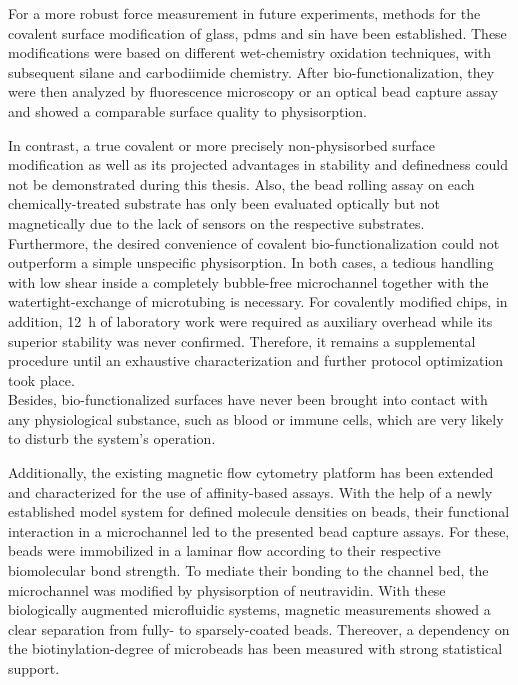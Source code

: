 For a more robust force measurement in future experiments, methods for the covalent surface modification of glass, \gls{pdms} and \gls{sin} have been established. These modifications were based on different wet-chemistry oxidation techniques, with subsequent silane and carbodiimide chemistry. After bio-functionalization, they were then analyzed by fluorescence microscopy or an optical bead capture assay and showed a comparable surface quality to physisorption.

In contrast, a true covalent or more precisely non-physisorbed surface modification as well as its projected advantages in stability and definedness could not be demonstrated during this thesis. Also, the bead rolling assay on each chemically-treated substrate has only been evaluated optically but not magnetically due to the lack of sensors on the respective substrates.\\
Furthermore, the desired convenience of covalent bio-functionalization could not outperform a simple unspecific physisorption. In both cases, a tedious handling with low shear inside a completely bubble-free microchannel together with the watertight-exchange of microtubing is necessary. For covalently modified chips, in addition, \SI{12}{\hour} of laboratory work were required as auxiliary overhead while its superior stability was never confirmed. Therefore, it remains a supplemental procedure until an exhaustive characterization and further protocol optimization took place.\\
Besides, bio-functionalized surfaces have never been brought into contact with any physiological substance, such as blood or immune cells, which are very likely to disturb the system's operation.

Additionally, the existing magnetic flow cytometry platform has been extended and characterized for the use of affinity-based assays. With the help of a newly established model system for defined molecule densities on beads, their functional interaction in a microchannel led to the presented bead capture assays. For these, beads were immobilized in a laminar flow according to their respective biomolecular bond strength. To mediate their bonding to the channel bed, the microchannel was modified by physisorption of neutravidin. With these biologically augmented microfluidic systems, magnetic measurements showed a clear separation from fully- to sparsely-coated beads. Thereover, a dependency on the biotinylation-degree of microbeads has been measured with strong statistical support.




%
%
%
%
%
%
